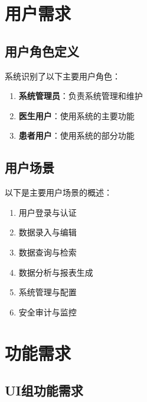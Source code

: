 \documentclass[a4paper,12pt]{article}
\begin{document}
\section{用户需求}

\subsection{用户角色定义}

系统识别了以下主要用户角色：

\begin{enumerate}
  \item \textbf{系统管理员}：负责系统管理和维护
  \item \textbf{医生用户}：使用系统的主要功能
  \item \textbf{患者用户}：使用系统的部分功能

\end{enumerate}

\subsection{用户场景}

以下是主要用户场景的概述：

\begin{enumerate}
  \item 用户登录与认证
  \item 数据录入与编辑
  \item 数据查询与检索
  \item 数据分析与报表生成
  \item 系统管理与配置
  \item 安全审计与监控
\end{enumerate}

\section{功能需求}

\subsection{UI组功能需求}
\end{document}
